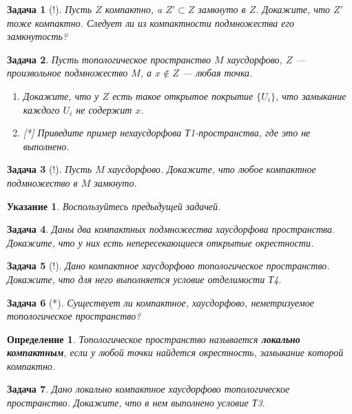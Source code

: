 \documentclass[12pt]{book}
\theoremstyle{upshape}
\newtheorem{zadacha}{Задача}[chapter]
\theoremstyle{generic}
\newtheorem{opredelenie}[teorema]{Определение}
\theoremstyle{upshapenonumber}
\newtheorem{ukazanie}{Указание}[section]
\newcommand{\следствие}{%
     \refstepcounter{teorema}
     {\noindent\bf Следствие \thechapter.\arabic{teorema}:\ }}
\newcommand{\пример}{%
     \refstepcounter{teorema}
     {\noindent\bf Пример \thechapter.\arabic{teorema}:\ }}
\newcommand{\лемма}{%
     \refstepcounter{teorema}
     {\noindent\bf Лемма \thechapter.\arabic{teorema}:\ }}
\newcommand{\теорема}{%
     \refstepcounter{teorema}
     {\noindent\bf Теорема \thechapter.\arabic{teorema}:\ }}
\newcommand{\утверждение}{%
     \refstepcounter{teorema}
     {\noindent\bf Утверждение \thechapter.\arabic{teorema}:\ }}
\def\ит{\it}
\def\итем{\item %
}
\begin{document}
{\begin{zadacha}[!]
Пусть $Z$ компактно, a $Z' \subset Z$ замкнуто в $Z$.
Докажите, что $Z'$ тоже компактно. Следует ли из 
компактности подмножества его замкнутость?
\end{zadacha}

\begin{zadacha} 
Пусть топологическое пространство $M$ хаусдорфово, 
$Z$ --- произвольное подмножество
$M$, а $x\notin Z$ --- любая точка.
\begin{enumerate}
\итем  Докажите, что у $Z$
есть такое открытое покрытие $\{U_i\}$, что замыкание
каждого $U_i$ не содержит $x$. 

\итем[*] Приведите пример нехаусдорфова Т1-пространства, где
это не выполнено.
\end{enumerate}
\end{zadacha}

\begin{zadacha}[!]
Пусть $M$ хаусдорфово.
Докажите, что любое компактное подмножество в $M$ замкнуто.
\end{zadacha}

\begin{ukazanie}
Воспользуйтесь предыдущей задачей.
\end{ukazanie}

\begin{zadacha} 
Даны два компактных подмножества хаусдорфова пространства.
Докажите, что у них есть непересекающиеся открытые окрестности.
\end{zadacha}

\begin{zadacha}[!]
Дано компактное хаусдорфово топологическое пространство.
Докажите, что для него выполняется условие отделимости Т4.
\end{zadacha}


\begin{zadacha}[*]
Существует ли компактное, хаусдорфово, неметризуемое топологическое
пространство? 
\end{zadacha}

\begin{opredelenie}
Топологическое пространство называется {\bf локально
компактным}, если у любой точки найдется окрестность,
замыкание которой компактно.
\end{opredelenie}

\begin{zadacha} 
Дано локально компактное хаусдорфово топологическое пространство.
Докажите, что в нем выполнено условие Т3.
\end{zadacha}

}
\end{document}
